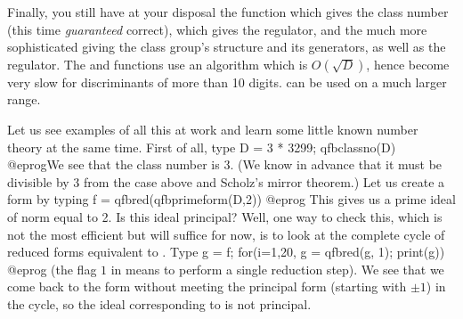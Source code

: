 Finally, you still have at your disposal the function  which
gives the class number (this time \emph{guaranteed} correct),
 which gives the regulator, and the much more sophisticated
 giving the class group's structure and its generators,
as well as the regulator. The  and 
functions use an algorithm which is $O(\sqrt D)$, hence become very slow for
discriminants of more than 10 digits.  can be used on a
much larger range.

Let us see examples of all this at work and learn some little known number
theory at the same time. First of all, type
\bprog
  D = 3 * 3299; qfbclassno(D)
@eprog\noindent We see that the class number is 3. (We know
in advance that it must be divisible by 3 from the  case above
and Scholz's mirror theorem.) Let us create a form by typing
\bprog
  f = qfbred(qfbprimeform(D,2))
@eprog\noindent
This gives us a prime ideal of norm equal to 2. Is this ideal principal?
Well, one way to check this, which is not the most efficient but will suffice
for now, is to look at the complete cycle of reduced forms equivalent to
. Type
\bprog
 g = f; for(i=1,20, g = qfbred(g, 1); print(g))
@eprog\noindent
(the flag $1$ in  means to perform a single reduction step). We
see that we come back to the form  without meeting the principal form
(starting with $\pm1$) in the cycle, so the ideal corresponding to  is
not principal.

